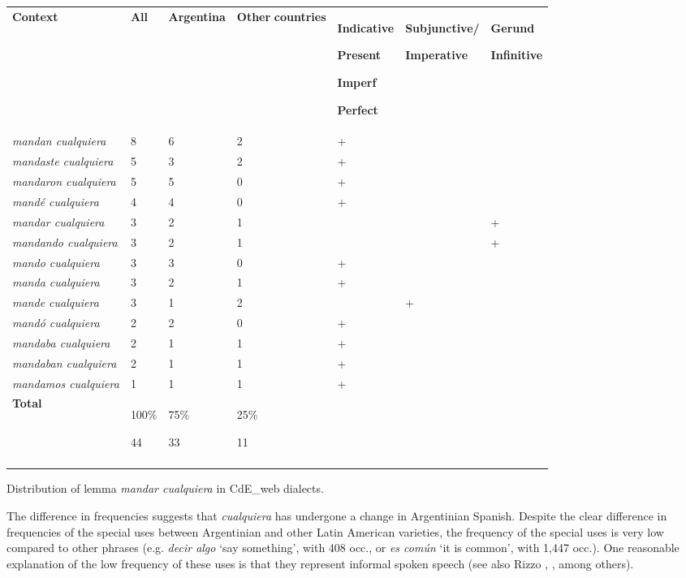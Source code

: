 \begin{table}
\begin{tabularx}{\textwidth}{XXXXXXX}
\lsptoprule
 \textbf{Context} & \textbf{All} & \textbf{Argentina} & \textbf{Other} \textbf{countries} & { \textbf{Indicative}}

{ \textbf{Present}}

{ \textbf{Imperf}}

 \textbf{Perfect} & { \textbf{Subjunctive/}}

 \textbf{Imperative} & { \textbf{Gerund}}

{ \textbf{Infinitive}}\\
 \textit{mandan cualquiera} & 8 & 6 & 2 & + &  & \\
 \textit{mandaste cualquiera} & 5 & 3 & 2 & + &  & \\
 \textit{mandaron cualquiera} & 5 & 5 & 0 & + &  & \\
 \textit{mandé cualquiera} & 4 & 4 & 0 & + &  & \\
 \textit{mandar cualquiera} & 3 & 2 & 1 &  &  & +\\
 \textit{mandando cualquiera} & 3 & 2 & 1 &  &  & +\\
 \textit{mando cualquiera} & 3 & 3 & 0 & + &  & \\
 \textit{manda cualquiera} & 3 & 2 & 1 & + &  & \\
 \textit{mande cualquiera} & 3 & 1 & 2 &  & + & \\
 \textit{mandó cualquiera} & 2 & 2 & 0 & + &  & \\
 \textit{mandaba cualquiera} & 2 & 1 & 1 & + &  & \\
 \textit{mandaban cualquiera} & 2 & 1 & 1 & + &  & \\
 \textit{mandamos cualquiera} & 1 & 1 & 1 & + &  & \\
 \textbf{Total} & { 100\%}

 44 & { 75\%}

 33 & { 25\%}

 11 &  &  & \\
\lspbottomrule
\end{tabularx}
\caption{\label{tab:} ~}Distribution of lemma \textit{mandar cualquiera} in CdE\_web dialects.
\end{table}

The difference in frequencies suggests that \textit{cualquiera} has undergone a change in Argentinian Spanish. Despite the clear difference in frequencies of the special uses between Argentinian and other Latin American varieties, the frequency of the special uses is very low compared to other phrases (e.g. \textit{decir algo} ‘say something’, with 408 occ., or \textit{es común} ‘it is common’, with 1,447 occ.). One reasonable explanation of the low frequency of these uses is that they represent informal spoken speech (see also Rizzo \citealt{Salierno2013}, \citealt{Conde2011}, among others). 

